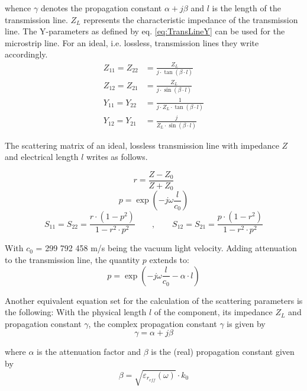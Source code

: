 whence $\gamma$ denotes the propagation constant $\alpha + j\beta$ and
$l$ is the length of the transmission line.  $Z_L$ represents the
characteristic impedance of the transmission line.  The Y-parameters
as defined by eq. \eqref{eq:TransLineY} can be used for the microstrip
line.  For an ideal, i.e. lossless, transmission lines they write
accordingly.
\begin{align}
Z_{11} = Z_{22} &= \frac{Z_L}{j\cdot\tan{\left(\beta\cdot l\right)}}\\
Z_{12} = Z_{21} &= \frac{Z_L}{j\cdot\sin{\left(\beta\cdot l\right)}}\\
Y_{11} = Y_{22} &= \frac{1}{j\cdot Z_L \cdot \tan{\left(\beta\cdot l\right)}}\\
Y_{12} = Y_{21} &= \frac{j}{Z_L\cdot \sin{\left(\beta\cdot l\right)}}
\end{align}

The scattering matrix of an ideal, lossless transmission line with
impedance $Z$ and electrical length $l$ writes as follows.

\begin{equation}
r = \frac{Z-Z_0}{Z+Z_0}
\end{equation}
\begin{equation}
p = \exp\left(-j\omega\frac{l}{c_0}\right)
\end{equation}
\begin{equation}
S_{11} = S_{22} = \frac{r\cdot(1-p^2)}{1-r^2\cdot p^2} \qquad,\qquad
S_{12} = S_{21} = \frac{p\cdot(1-r^2)}{1-r^2\cdot p^2}
\end{equation}

With $c_0$ = 299 792 458 m/s being the vacuum light velocity.
Adding attenuation to the transmission line, the quantity $p$
extends to:
\begin{equation}
p = \exp\left(-j\omega\frac{l}{c_0} - \alpha\cdot l \right)
\end{equation}

Another equivalent equation set for the calculation of the
scattering parameters is the following:
With the physical length $l$ of the component, its impedance
$Z_L$ and propagation constant $\gamma$, the complex propagation
constant $\gamma$ is given by
\begin{equation}
\gamma = \alpha + j\beta
\end{equation}

where $\alpha$ is the attenuation factor and $\beta$ is the (real)
propagation constant given by
\begin{equation}
\beta = \sqrt{\varepsilon_{r_{eff}}(\omega)} \cdot k_0
\end{equation}

